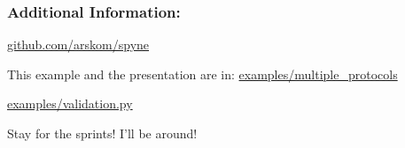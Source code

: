 \documentclass{beamer}
\begin{document}
\begin{frame}
  \frametitle{Additional Information:}

  \begin{center}
  \huge

  \href{http://github.com/arskom/spyne}{github.com/arskom/spyne}

  \bigskip

  \large

  This example and the presentation are in:
  \href{https://github.com/arskom/spyne/tree/master/examples/multiple_protocols}{examples/multiple\_protocols}

  \href{https://github.com/arskom/spyne/tree/master/examples/validation.py}{examples/validation.py}

  \bigskip

  Stay for the sprints! I'll be around!

  \end{center}

\end{frame}
\end{document}
